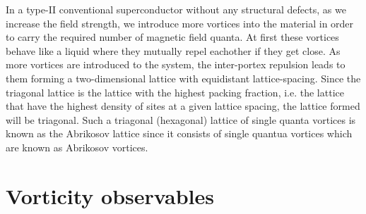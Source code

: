 In a type-II conventional superconductor without any structural defects, as we increase the field strength, we introduce more vortices into the material
in order to carry the required number of magnetic field quanta. At first these vortices behave like a liquid where they mutually repel eachother if they 
get close. As more vortices are introduced to the system, the inter-portex repulsion leads to them forming a two-dimensional lattice with equidistant lattice-spacing.
Since the triagonal lattice is the lattice with the highest packing fraction, i.e. the lattice that have the highest density of sites at a given lattice spacing,
the lattice formed will be triagonal. Such a triagonal (hexagonal) lattice of single quanta vortices is known as the Abrikosov lattice since it consists
of single quantua vortices which are known as Abrikosov vortices.

\section{Vorticity observables}
\label{sec:Vor:Obs}



